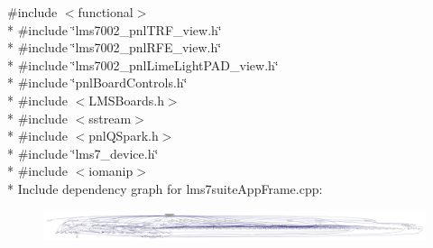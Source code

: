 {\ttfamily \#include $<$functional$>$}\\*
{\ttfamily \#include \char`\"{}lms7002\+\_\+pnl\+T\+R\+F\+\_\+view.\+h\char`\"{}}\\*
{\ttfamily \#include \char`\"{}lms7002\+\_\+pnl\+R\+F\+E\+\_\+view.\+h\char`\"{}}\\*
{\ttfamily \#include \char`\"{}lms7002\+\_\+pnl\+Lime\+Light\+P\+A\+D\+\_\+view.\+h\char`\"{}}\\*
{\ttfamily \#include \char`\"{}pnl\+Board\+Controls.\+h\char`\"{}}\\*
{\ttfamily \#include $<$L\+M\+S\+Boards.\+h$>$}\\*
{\ttfamily \#include $<$sstream$>$}\\*
{\ttfamily \#include $<$pnl\+Q\+Spark.\+h$>$}\\*
{\ttfamily \#include \char`\"{}lms7\+\_\+device.\+h\char`\"{}}\\*
{\ttfamily \#include $<$iomanip$>$}\\*
Include dependency graph for lms7suite\+App\+Frame.\+cpp\+:
\nopagebreak
\begin{figure}[H]
\begin{center}
\leavevmode
\includegraphics[width=350pt]{d5/d47/lms7suiteAppFrame_8cpp__incl}
\end{center}
\end{figure}
